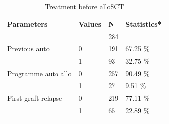 \documentclass[a4paper,11pt] {article}
\begin{document}
\begin{longtable}{llll}
  \hline
Parameters & Values & N & Statistics* \\ 
  \hline
 &  & 284 &  \\ 
  Previous auto & 0 & 191 & 67.25 \% \\ 
   & 1 & 93 & 32.75 \% \\ 
   Programme auto allo & 0 & 257 & 90.49 \% \\ 
   & 1 & 27 & 9.51 \% \\ 
  First graft relapse & 0 & 219 & 77.11 \% \\ 
   & 1 & 65 & 22.89 \% \\ 
   \hline
\hline
\caption{Treatment before alloSCT} 
\label{tab:avtg}
\end{longtable}
\end{document}
